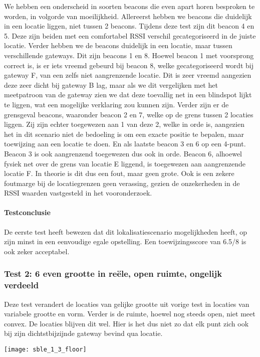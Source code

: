 We hebben een onderscheid in soorten beacons die even apart horen besproken te worden, in volgorde van moeilijkheid. Allereerst hebben we beacons die duidelijk in een locatie liggen, niet tussen 2 beacons. Tijdens deze test zijn dit beacon 4 en 5. Deze zijn beiden met een comfortabel RSSI verschil gecategoriseerd in de juiste locatie. Verder hebben we de beacons duidelijk in een locatie, maar tussen verschillende gateways. Dit zijn beacons 1 en 8. Hoewel beacon 1 met voorsprong correct is, is er iets vreemd gebeurd bij beacon 8, welke gecategoriseerd wordt bij gateway F, van een zelfs niet aangrenzende locatie.  Dit is zeer vreemd aangezien deze zeer dicht bij gateway B lag, maar als we dit vergelijken met het meetpatroon van de gateway zien we dat deze toevallig net in een blindspot lijkt te liggen, wat een mogelijke verklaring zou kunnen zijn. Verder zijn er de grensgeval beacons, waaronder beacon 2 en 7, welke op de grens tussen 2 locaties liggen. Zij zijn echter toegewezen aan 1 van deze 2, welke in orde is, aangezien het in dit scenario niet de bedoeling is om een exacte positie te bepalen, maar toewijzing aan een locatie te doen. En als laatste beacon 3 en 6 op een 4-punt. Beacon 3 is ook aangrenzend toegewezen dus ook in orde. Beacon 6, alhoewel fysiek net over de grens van locatie E liggend, is toegewezen aan aangrenzende locatie F. In theorie is dit dus een fout, maar geen grote. Ook is een zekere foutmarge bij de locatiegrenzen geen verassing, gezien de onzekerheden in de RSSI waarden vastgesteld in het vooronderzoek.

\paragraph{Testconclusie}
De eerste test heeft bewezen dat dit lokalisatiescenario mogelijkheden heeft, op zijn minst in een eenvoudige egale opstelling. Een toewijzingsscore van 6.5/8 is ook zeker acceptabel.

\subsubsection{Test 2: 6 even grootte in reële, open ruimte, ongelijk verdeeld}
\begin{minipage}{0.55\textwidth}
Deze test verandert de locaties van gelijke grootte uit vorige test in locaties van variabele grootte en vorm. Verder is de ruimte, hoewel nog steeds open, niet meet convex. De locaties blijven dit wel. Hier is het dus niet zo dat elk punt zich ook bij zijn dichtstbijzijnde gateway bevind qua locatie.
\end{minipage}
\hfill
\begin{minipage}{0.42\textwidth}
	\texttt{[image: sble\_1\_3\_floor]}
\end{minipage}

